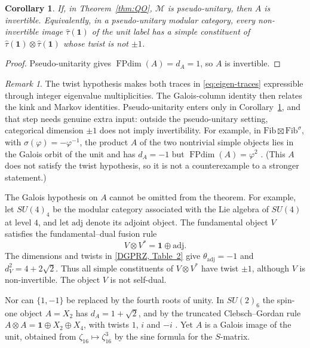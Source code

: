 \documentclass[11pt,oneside]{amsart}
\newtheorem{corollary}[theorem]{Corollary}
\theoremstyle{remark}
\newtheorem{remark}[theorem]{Remark}
\newcommand{\M}{\mathcal M}
\newcommand{\one}{\mathbf 1}
\newcommand{\FP}{\operatorname{FPdim}}
\newcommand{\htau}{\hat\tau}
\newcommand{\sourcecite}[3]{\nocite{#1}\href{#3}{[#1, #2]}}
\begin{document}
\begin{corollary}\label{cor:QO}
If, in Theorem~\ref{thm:QO}, $\M$ is pseudo-unitary, then $A$ is invertible.
Equivalently, in a pseudo-unitary modular category, every non-invertible
image $\htau(\one)$ of the unit label has a simple constituent of
$\htau(\one)\otimes\htau(\one)$ whose twist is not $\pm1$.
\end{corollary}

\begin{proof}
Pseudo-unitarity gives $\FP(A)=d_A=1$, so $A$ is invertible.
\end{proof}

\begin{remark}\label{rem:hypotheses}
The twist hypothesis makes both traces in \eqref{eq:eigen-traces} expressible
through integer eigenvalue multiplicities. The Galois-column identity then
relates the kink and Markov identities. Pseudo-unitarity enters only in
Corollary~\ref{cor:QO}, and that step needs genuine extra input: outside the
pseudo-unitary setting, categorical dimension $\pm1$ does not imply
invertibility. For example, in $\mathrm{Fib}\boxtimes\mathrm{Fib}^\sigma$, with
$\sigma(\varphi)=-\varphi^{-1}$, the product $A$ of the two nontrivial simple
objects lies in the Galois orbit of the unit and has $d_A=-1$ but
$\FP(A)=\varphi^2$ \cite{PSYZ}. (This $A$ does not satisfy the twist hypothesis,
so it is not a counterexample to a stronger statement.)

The Galois hypothesis on $A$ cannot be omitted
from the theorem. For example, let $SU(4)_4$ be the modular category
associated with the Lie algebra of $SU(4)$ at level $4$, and let
$\mathrm{adj}$ denote its adjoint object. The fundamental object $V$
satisfies the fundamental--dual fusion rule
\[
V\otimes V^*=\one\oplus\mathrm{adj}.
\]
The dimensions and twists in \sourcecite{DGPRZ}{Table~2}{https://arxiv.org/html/2005.05544v2\#S6.T2} give
$\theta_{\mathrm{adj}}=-1$ and $d_V^2=4+2\sqrt2$.
Thus all simple constituents of $V\otimes V^*$ have twist $\pm1$, although
$V$ is non-invertible. The object $V$ is not self-dual.

Nor can $\{1,-1\}$ be replaced by the fourth roots of unity. In $SU(2)_6$ the
spin-one object $A=X_2$ has $d_A=1+\sqrt2$, and by the truncated
Clebsch--Gordan rule $A\otimes A=\one\oplus X_2\oplus X_4$, with twists $1$, $i$
and $-i$ \cite[\S4]{BRWZ}. Yet $A$ is a Galois image of the unit, obtained from
$\zeta_{16}\mapsto\zeta_{16}^3$ by the sine formula for the $S$-matrix.
\end{remark}
\end{document}
